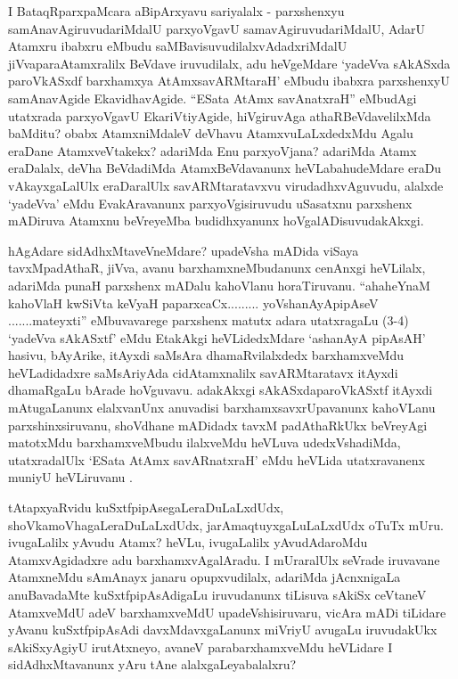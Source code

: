 \begin{artha}
I BataqRparxpaMcara aBipArxyavu sariyalalx - parxshenxyu samAnavAgiruvudariMdalU parxyoVgavU samavAgiruvudariMdalU, AdarU Atamxru ibabxru eMbudu saMBavisuvudilalxvAdadxriMdalU jiVvaparaAtamxralilx BeVdave iruvudilalx, adu heVgeMdare `yadeVva sAkASxda paroVkASxdf barxhamxya AtAmxsavARMtaraH' eMbudu ibabxra parxshenxyU samAnavAgide EkavidhavAgide. ``ESata AtAmx savAnatxraH'' eMbudAgi utatxrada parxyoVgavU EkariVtiyAgide, hiVgiruvAga athaRBeVdavelilxMda baMditu? obabx AtamxniMdaleV deVhavu AtamxvuLaLxdedxMdu Agalu eraDane AtamxveVtakekx? adariMda Enu parxyoVjana? adariMda Atamx eraDalalx, deVha BeVdadiMda AtamxBeVdavanunx heVLabahudeMdare eraDu vAkayxgaLalUlx eraDaralUlx savARMtaratavxvu virudadhxvAguvudu, alalxde `yadeVva' eMdu EvakAravanunx parxyoVgisiruvudu uSasatxnu parxshenx mADiruva Atamxnu beVreyeMba budidhxyanunx hoVgalADisuvudakAkxgi.
\end{artha}


\begin{artha}
hAgAdare sidAdhxMtaveVneMdare? upadeVsha mADida viSaya tavxMpadAthaR, jiVva, avanu barxhamxneMbudanunx cenAnxgi heVLilalx, adariMda punaH parxshenx mADalu kahoVlanu horaTiruvanu. ``ahaheYnaM kahoVlaH kwSiVta keVyaH paparxcaCx......... yoV\s shanAyApipAseV .......mateyxti'' eMbuvavarege parxshenx matutx adara utatxragaLu (3-4) `yadeVva sAkASxtf' eMdu EtakAkgi heVLidedxMdare `ashanAyA pipAsAH' hasivu, bAyArike, itAyxdi saMsAra dhamaRvilalxdedx barxhamxveMdu heVLadidadxre saMsAriyAda cidAtamxnalilx savARMtaratavx itAyxdi dhamaRgaLu bArade hoVguvavu. adakAkxgi sAkASxdaparoVkASxtf itAyxdi mAtugaLanunx elalxvanUnx anuvadisi barxhamxsavxrUpavanunx kahoVLanu parxshinxsiruvanu, shoVdhane mADidadx tavxM padAthaRkUkx beVreyAgi matotxMdu barxhamxveMbudu ilalxveMdu heVLuva udedxVshadiMda, utatxradalUlx `ESata AtAmx savARnatxraH' eMdu heVLida utatxravanenx muniyU heVLiruvanu .
\end{artha}

\begin{artha}
tAtapxyaRvidu \mdash  kuSxtfpipAsegaLeraDuLaLxdUdx, shoVkamoVhagaLeraDuLaLxdUdx, jarAmaqtuyxgaLuLaLxdUdx oTuTx mUru. ivugaLalilx yAvudu Atamx? heVLu, ivugaLalilx yAvudAdaroMdu AtamxvAgidadxre adu barxhamxvAgalAradu. I mUraralUlx seVrade iruvavane AtamxneMdu sAmAnayx janaru opupxvudilalx, adariMda jAcnxnigaLa anuBavadaMte kuSxtfpipAsAdigaLu iruvudanunx tiLisuva sAkiSx ceVtaneV AtamxveMdU adeV barxhamxveMdU upadeVshisiruvaru, vicAra mADi tiLidare yAvanu kuSxtfpipAsAdi davxMdavxgaLanunx miVriyU avugaLu iruvudakUkx sAkiSxyAgiyU irutAtxneyo, avaneV parabarxhamxveMdu heVLidare I sidAdhxMtavanunx yAru tAne alalxgaLeyabalalxru?
\end{artha}


